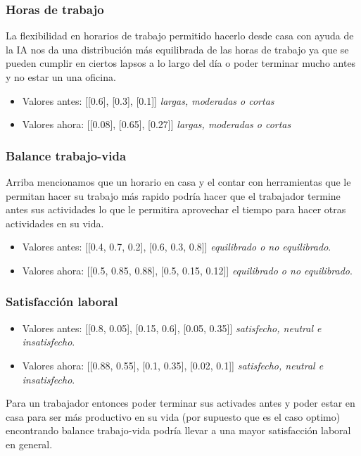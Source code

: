 \subsubsection*{Horas de trabajo}
La flexibilidad en horarios de trabajo permitido hacerlo desde casa con ayuda de la IA nos 
da una distribución más equilibrada de las horas de trabajo ya que se pueden cumplir en 
ciertos lapsos a lo largo del día o poder terminar mucho antes y no estar un una oficina.

\begin{itemize}
    \item Valores antes: [[0.6], [0.3], [0.1]] \textit{largas, moderadas o cortas}
    \item Valores ahora: [[0.08], [0.65], [0.27]] \textit{largas, moderadas o cortas}
\end{itemize}


\subsubsection*{Balance trabajo-vida}
Arriba mencionamos que un horario en casa y el contar con herramientas que le permitan hacer
su trabajo más rapido podría hacer que el trabajador termine antes sus actividades lo que 
le permitira aprovechar el tiempo para hacer otras actividades en su vida.

\begin{itemize}
    \item Valores antes: [[0.4, 0.7, 0.2], [0.6, 0.3, 0.8]] \textit{equilibrado o no equilibrado}.
    \item Valores ahora: [[0.5, 0.85, 0.88], [0.5, 0.15, 0.12]] \textit{equilibrado o no equilibrado}.
\end{itemize}

\subsubsection*{Satisfacción laboral}

\begin{itemize}
    \item Valores antes: [[0.8, 0.05], [0.15, 0.6], [0.05, 0.35]] \textit{satisfecho, neutral e insatisfecho}.
    \item Valores ahora: [[0.88, 0.55], [0.1, 0.35], [0.02, 0.1]] \textit{satisfecho, neutral e insatisfecho}.
\end{itemize}

Para un trabajador entonces poder terminar sus activades antes y poder estar en casa para ser 
más productivo en su vida (por supuesto que es el caso optimo) encontrando balance trabajo-vida podría 
llevar a una mayor satisfacción laboral en general.